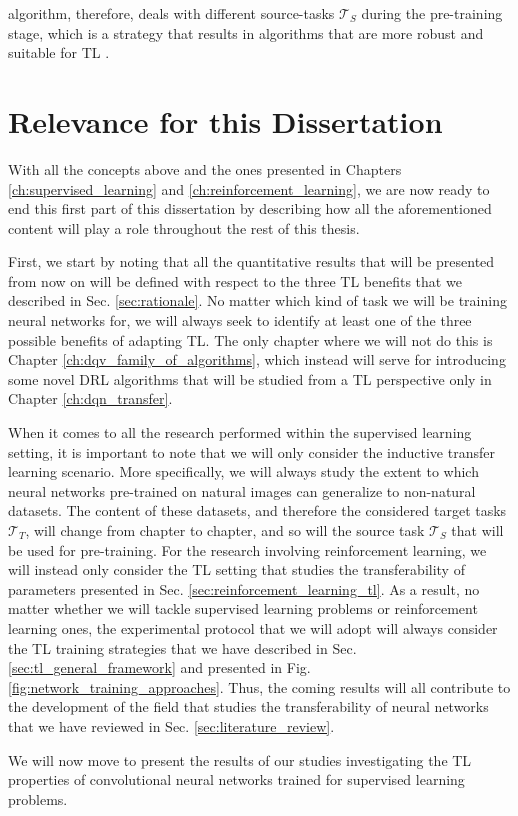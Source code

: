 algorithm, therefore, deals with different source-tasks $\mathcal{T}_S$ during the pre-training stage, which is a strategy that results in algorithms that are more robust and suitable for TL \cite{kirkpatrick2017overcoming}.  


\section{Relevance for this Dissertation}
\label{sec:relevance}

With all the concepts above and the ones presented in Chapters \ref{ch:supervised_learning} and \ref{ch:reinforcement_learning}, we are now ready to end this first part of this dissertation by describing how all the aforementioned content will play a role throughout the rest of this thesis. 

First, we start by noting that all the quantitative results that will be presented from now on will be defined with respect to the three TL benefits that we described in Sec. \ref{sec:rationale}. No matter which kind of task we will be training neural networks for, we will always seek to identify at least one of the three possible benefits of adapting TL. The only chapter where we will not do this is Chapter \ref{ch:dqv_family_of_algorithms}, which instead will serve for introducing some novel DRL algorithms that will be studied from a TL perspective only in Chapter \ref{ch:dqn_transfer}.

When it comes to all the research performed within the supervised learning setting, it is important to note that we will only consider the inductive transfer learning scenario. More specifically, we will always study the extent to which neural networks pre-trained on natural images can generalize to non-natural datasets. The content of these datasets, and therefore the considered target tasks $\mathcal{T}_T$, will change from chapter to chapter, and so will the source task $\mathcal{T}_S$ that will be used for pre-training. For the research involving reinforcement learning, we will instead only consider the TL setting that studies the transferability of parameters presented in Sec. \ref{sec:reinforcement_learning_tl}. As a result, no matter whether we will tackle supervised learning problems or reinforcement learning ones, the experimental protocol that we will adopt will always consider the TL training strategies that we have described in Sec. \ref{sec:tl_general_framework} and presented in Fig. \ref{fig:network_training_approaches}. Thus, the coming results will all contribute to the development of the field that studies the transferability of neural networks that we have reviewed in Sec. \ref{sec:literature_review}.

We will now move to present the results of our studies investigating the TL properties of convolutional neural networks trained for supervised learning problems.

